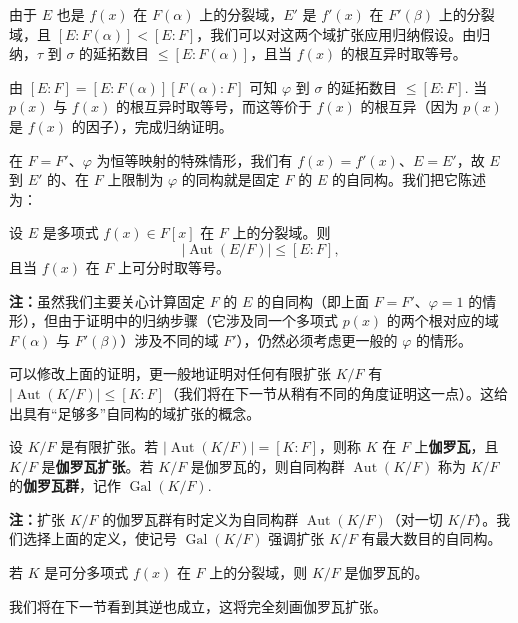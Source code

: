 由于 \(E\) 也是 \(f(x)\) 在 \(F(\alpha)\) 上的分裂域，\(E'\) 是 \(f'(x)\) 在 \(F'(\beta)\) 上的分裂域，且 \([E:F(\alpha)] < [E:F]\)，我们可以对这两个域扩张应用归纳假设。由归纳，\(\tau\) 到 \(\sigma\) 的延拓数目 \(\leq [E:F(\alpha)]\)，且当 \(f(x)\) 的根互异时取等号。

由 \([E:F] = [E:F(\alpha)][F(\alpha):F]\) 可知 \(\varphi\) 到 \(\sigma\) 的延拓数目 \(\leq [E:F]\). 当 \(p(x)\) 与 \(f(x)\) 的根互异时取等号，而这等价于 \(f(x)\) 的根互异（因为 \(p(x)\) 是 \(f(x)\) 的因子），完成归纳证明。

在 \(F = F'\)、\(\varphi\) 为恒等映射的特殊情形，我们有 \(f(x) = f'(x)\)、\(E = E'\)，故 \(E\) 到 \(E'\) 的、在 \(F\) 上限制为 \(\varphi\) 的同构就是固定 \(F\) 的 \(E\) 的自同构。我们把它陈述为：

\begin{proposition}\label{pro:14.5}
设 \(E\) 是多项式 \(f(x) \in F[x]\) 在 \(F\) 上的分裂域。则
\[
|\operatorname{Aut}(E/F)| \leq [E:F],
\]
且当 \(f(x)\) 在 \(F\) 上可分时取等号。
\end{proposition}

\noindent\textbf{注：}虽然我们主要关心计算固定 \(F\) 的 \(E\) 的自同构（即上面 \(F = F'\)、\(\varphi = 1\) 的情形），但由于证明中的归纳步骤（它涉及同一个多项式 \(p(x)\) 的两个根对应的域 \(F(\alpha)\) 与 \(F'(\beta)\)）涉及不同的域 \(F'\)），仍然必须考虑更一般的 \(\varphi\) 的情形。

可以修改上面的证明，更一般地证明对任何有限扩张 \(K/F\) 有 \(|\operatorname{Aut}(K/F)| \leq [K:F]\)（我们将在下一节从稍有不同的角度证明这一点）。这给出具有“足够多”自同构的域扩张的概念。

\begin{definition}
设 \(K/F\) 是有限扩张。若 \(|\operatorname{Aut}(K/F)| = [K:F]\)，则称 \(K\) 在 \(F\) 上\textbf{伽罗瓦}，且 \(K/F\) 是\textbf{伽罗瓦扩张}。若 \(K/F\) 是伽罗瓦的，则自同构群 \(\operatorname{Aut}(K/F)\) 称为 \(K/F\) 的\textbf{伽罗瓦群}，记作 \(\operatorname{Gal}(K/F)\).
\end{definition}

\noindent\textbf{注：}扩张 \(K/F\) 的伽罗瓦群有时定义为自同构群 \(\operatorname{Aut}(K/F)\)（对一切 \(K/F\)）。我们选择上面的定义，使记号 \(\operatorname{Gal}(K/F)\) 强调扩张 \(K/F\) 有最大数目的自同构。

\begin{corollary}\label{cor:14.6}
若 \(K\) 是可分多项式 \(f(x)\) 在 \(F\) 上的分裂域，则 \(K/F\) 是伽罗瓦的。
\end{corollary}

我们将在下一节看到其逆也成立，这将完全刻画伽罗瓦扩张。


